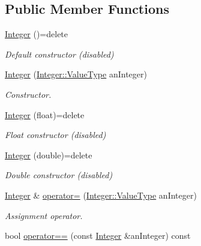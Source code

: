\subsection*{Public Member Functions}
\begin{DoxyCompactItemize}
\item 
\hyperlink{classlibrary_1_1core_1_1types_1_1Integer_a6483b1c4e13e5ed6af5e7a58347efead}{Integer} ()=delete
\begin{DoxyCompactList}\small\item\em Default constructor (disabled) \end{DoxyCompactList}\item 
\hyperlink{classlibrary_1_1core_1_1types_1_1Integer_ac282b8e24c1d1a43e578c5be3c70ea27}{Integer} (\hyperlink{classlibrary_1_1core_1_1types_1_1Integer_a623afb1580f870fd8a1997b1c12c917d}{Integer\+::\+Value\+Type} an\+Integer)
\begin{DoxyCompactList}\small\item\em Constructor. \end{DoxyCompactList}\item 
\hyperlink{classlibrary_1_1core_1_1types_1_1Integer_af3bcebe374c4b7b4329ed0a7fae04abd}{Integer} (float)=delete
\begin{DoxyCompactList}\small\item\em Float constructor (disabled) \end{DoxyCompactList}\item 
\hyperlink{classlibrary_1_1core_1_1types_1_1Integer_ab0d94d5cfc78f38f1598679015f4ab61}{Integer} (double)=delete
\begin{DoxyCompactList}\small\item\em Double constructor (disabled) \end{DoxyCompactList}\item 
\hyperlink{classlibrary_1_1core_1_1types_1_1Integer}{Integer} \& \hyperlink{classlibrary_1_1core_1_1types_1_1Integer_ab77cae94a9e6d4a405a555dd55763ea2}{operator=} (\hyperlink{classlibrary_1_1core_1_1types_1_1Integer_a623afb1580f870fd8a1997b1c12c917d}{Integer\+::\+Value\+Type} an\+Integer)
\begin{DoxyCompactList}\small\item\em Assignment operator. \end{DoxyCompactList}\item 
bool \hyperlink{classlibrary_1_1core_1_1types_1_1Integer_a52b3a012d6c6779773d051800daac516}{operator==} (const \hyperlink{classlibrary_1_1core_1_1types_1_1Integer}{Integer} \&an\+Integer) const

\end{DoxyCompactItemize}
